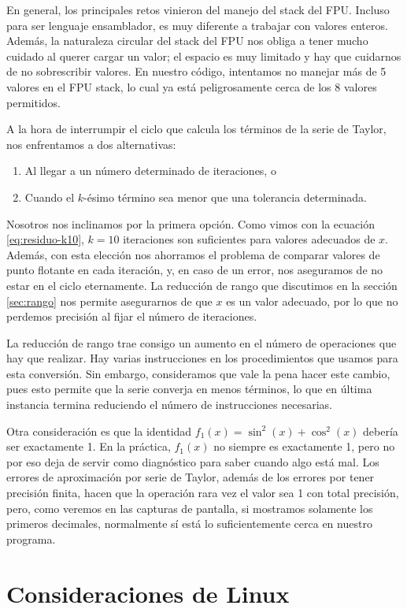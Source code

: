 \documentclass[12pt]{article}
\begin{document}
En general, los principales retos vinieron del manejo del stack del FPU.
Incluso para ser lenguaje ensamblador, es muy diferente a trabajar con valores
enteros. Además, la naturaleza circular del stack del FPU nos obliga a tener
mucho cuidado al querer cargar un valor; el espacio es muy limitado y hay que
cuidarnos de no sobrescribir valores. En nuestro código, intentamos no manejar
más de 5 valores en el FPU stack, lo cual ya está peligrosamente cerca de los 8
valores permitidos.

A la hora de interrumpir el ciclo que calcula los términos de la serie de
Taylor, nos enfrentamos a dos alternativas:
\begin{enumerate}
  \item Al llegar a un número determinado de iteraciones, o
  \item Cuando el $k$-ésimo término sea menor que una tolerancia determinada.
\end{enumerate}
Nosotros nos inclinamos por la primera opción. Como vimos con la ecuación
\eqref{eq:residuo-k10}, $k=10$ iteraciones son suficientes para valores
adecuados de $x$. Además, con esta elección nos ahorramos el problema de
comparar valores de punto flotante en cada iteración, y, en caso de un error,
nos aseguramos de no estar en el ciclo eternamente. La reducción de rango que
discutimos en la sección \ref{sec:rango} nos permite asegurarnos de que $x$ es
un valor adecuado, por lo que no perdemos precisión al fijar el número de
iteraciones.

La reducción de rango trae consigo un aumento en el número de operaciones que
hay que realizar. Hay varias instrucciones en los procedimientos que usamos
para esta conversión. Sin embargo, consideramos que vale la pena hacer este
cambio, pues esto permite que la serie converja en menos términos, lo que en
última instancia termina reduciendo el número de instrucciones necesarias.

Otra consideración es que la identidad $f_1(x) = \sin^2(x) + \cos^2(x)$ debería
ser exactamente 1. En la práctica, $f_1(x)$ no siempre es exactamente 1, pero
no por eso deja de servir como diagnóstico para saber cuando algo está mal. Los
errores de aproximación por serie de Taylor, además de los errores por tener
precisión finita, hacen que la operación rara vez el valor sea 1 con total
precisión, pero, como veremos en las capturas de pantalla, si mostramos
solamente los primeros decimales, normalmente sí está lo suficientemente cerca
en nuestro programa.

\section{Consideraciones de Linux} \label{sec:linux}
\end{document}
